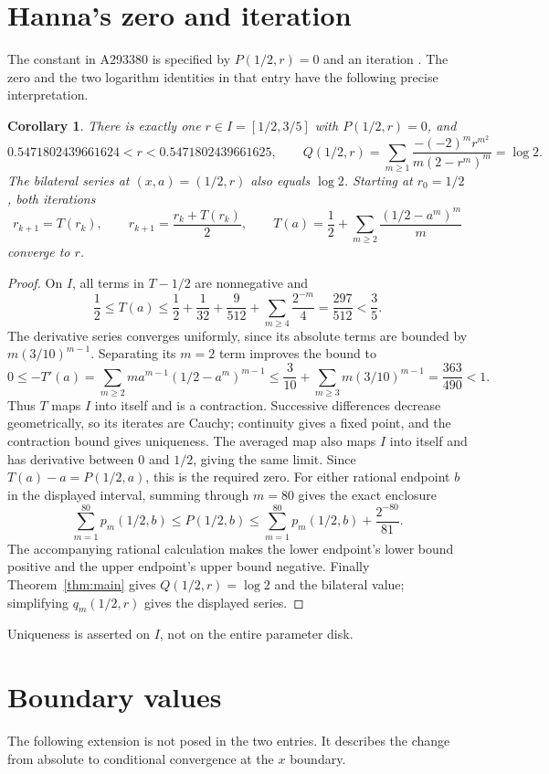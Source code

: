 \documentclass[11pt]{article}
\newtheorem{corollary}[theorem]{Corollary}
\begin{document}
\section{Hanna's zero and iteration}
The constant in A293380 is specified by $P(1/2,r)=0$ and an iteration
\cite[FORMULA and EXAMPLE]{hanna380}. The zero and the two logarithm
identities in that entry have the following precise interpretation.

\begin{corollary}\label{cor:root}
There is exactly one $r\in I=[1/2,3/5]$ with $P(1/2,r)=0$, and
\[
 0.5471802439661624<r<0.5471802439661625,\qquad
 Q(1/2,r)=\sum_{m\geq1}\frac{-(-2)^m r^{m^2}}{m(2-r^m)^m}=\log2.
\]
The bilateral series at $(x,a)=(1/2,r)$ also equals $\log2$.
Starting at $r_0=1/2$, both iterations
\[
 r_{k+1}=T(r_k),\qquad r_{k+1}=\frac{r_k+T(r_k)}2,\qquad
 T(a)=\frac12+\sum_{m\geq2}\frac{(1/2-a^m)^m}{m}
\]
converge to $r$.
\end{corollary}
\begin{proof}
On $I$, all terms in $T-1/2$ are nonnegative and
\[
 \frac12\leq T(a)\leq\frac12+\frac1{32}+\frac9{512}
             +\sum_{m\geq4}\frac{2^{-m}}4
 =\frac{297}{512}<\frac35.
\]
The derivative series converges uniformly, since its absolute terms
are bounded by $m(3/10)^{m-1}$. Separating its $m=2$ term improves the bound to
\[
 0\leq-T'(a)=\sum_{m\geq2}ma^{m-1}(1/2-a^m)^{m-1}
 \leq\frac3{10}+\sum_{m\geq3}m(3/10)^{m-1}
 =\frac{363}{490}<1.
\]
Thus $T$ maps $I$ into itself and is a contraction. Successive
differences decrease geometrically, so its iterates are Cauchy;
continuity gives a fixed point, and the contraction bound gives
uniqueness. The averaged map also maps $I$ into itself and has
derivative between $0$ and $1/2$, giving the same limit.
Since $T(a)-a=P(1/2,a)$, this is the required zero.
For either rational endpoint $b$ in the displayed interval, summing
through $m=80$ gives the exact enclosure
\[
 \sum_{m=1}^{80}p_m(1/2,b)\leq P(1/2,b)
 \leq\sum_{m=1}^{80}p_m(1/2,b)+\frac{2^{-80}}{81}.
\]
The accompanying rational calculation makes the lower endpoint's
lower bound positive and the upper endpoint's upper bound negative.
Finally Theorem~\ref{thm:main} gives $Q(1/2,r)=\log2$ and the
bilateral value; simplifying $q_m(1/2,r)$ gives the displayed series.
\end{proof}
Uniqueness is asserted on $I$, not on the entire parameter disk.

\section{Boundary values}
The following extension is not posed in the two entries. It describes
the change from absolute to conditional convergence at the $x$ boundary.
\end{document}

